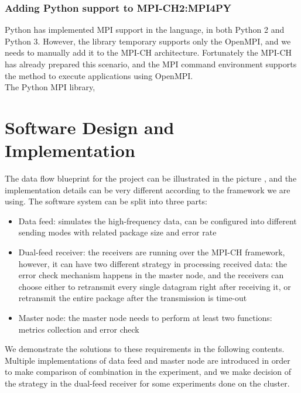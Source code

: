 \documentclass[11pt,openright,a4paper]{report}
\begin{document}
\subsubsection{Adding Python support to MPI-CH2:MPI4PY}
Python has implemented MPI support in the language, in both Python 2 and Python 3\cite{mpi4py}. However, the library temporary supports only the OpenMPI, and we needs to manually add it to the MPI-CH architecture. Fortunately the MPI-CH has already prepared this scenario, and the MPI command environment supports the method  to execute applications using OpenMPI.\\
The Python MPI library, 
\section{Software Design and Implementation}
The data flow blueprint for the project can be illustrated in the picture \cite{fig:LogicDesign}, and the implementation details can be very different according to the framework we are using. The software system can be split into three parts:
\begin{itemize}
	\item Data feed: simulates the high-frequency data, can be configured into different sending modes with related package size and error rate
	\item Dual-feed receiver: the receivers are running over the MPI-CH framework, however, it can have two different strategy in processing received data: the error check mechanism happens in the master node, and the receivers can choose either to retransmit every single datagram right after receiving it, or retransmit the entire package after the transmission is time-out
	\item Master node: the master node needs to perform at least two functions: metrics collection and error check
\end{itemize}
We demonstrate the solutions to these requirements in the following contents. Multiple implementations of data feed and master node are introduced in order to make comparison of combination in the experiment, and we make decision of the strategy in the dual-feed receiver for some experiments done on the cluster. 
\end{document}
